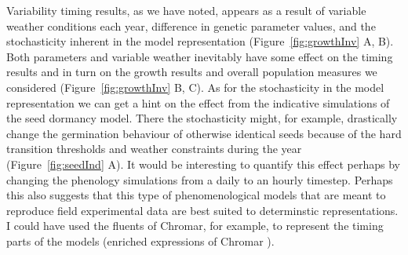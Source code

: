 Variability timing results, as we have noted, appears as a result of variable
weather conditions each year, difference in genetic parameter values, and the
stochasticity inherent in the model representation (Figure~\ref{fig:growthInv} A,
B). Both parameters and variable weather inevitably have some effect on the
timing results and in turn on the growth results and overall population measures
we considered (Figure~\ref{fig:growthInv} B, C). As for the stochasticity in the
model representation we can get a hint on the effect from the indicative
simulations of the seed dormancy model. There the stochasticity might, for
example, drastically change the germination behaviour of otherwise identical
seeds because of the hard transition thresholds and weather constraints during
the year (Figure~\ref{fig:seedInd} A). It would be interesting to quantify this
effect perhaps by changing the phenology simulations from a daily to an hourly
timestep. Perhaps this also suggests that this type of phenomenological models
that are meant to reproduce field experimental data are best suited to
determinstic representations. I could have used the fluents of Chromar, for
example, to represent the timing parts of the models (enriched expressions of
Chromar ).

